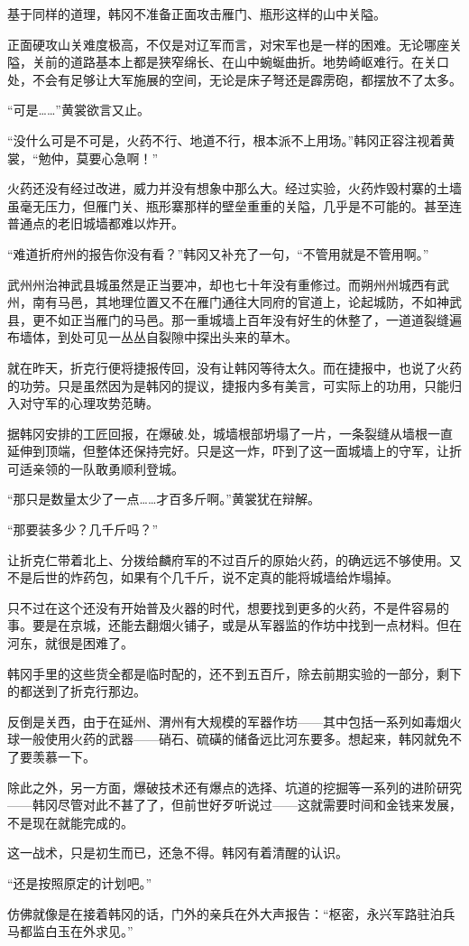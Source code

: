 基于同样的道理，韩冈不准备正面攻击雁门、瓶形这样的山中关隘。

正面硬攻山关难度极高，不仅是对辽军而言，对宋军也是一样的困难。无论哪座关隘，关前的道路基本上都是狭窄绵长、在山中蜿蜒曲折。地势崎岖难行。在关口处，不会有足够让大军施展的空间，无论是床子弩还是霹雳砲，都摆放不了太多。

“可是……”黄裳欲言又止。

“没什么可是不可是，火药不行、地道不行，根本派不上用场。”韩冈正容注视着黄裳，“勉仲，莫要心急啊！”

火药还没有经过改进，威力并没有想象中那么大。经过实验，火药炸毁村寨的土墙虽毫无压力，但雁门关、瓶形寨那样的壁垒重重的关隘，几乎是不可能的。甚至连普通点的老旧城墙都难以炸开。

“难道折府州的报告你没有看？”韩冈又补充了一句，“不管用就是不管用啊。”

武州州治神武县城虽然是正当要冲，却也七十年没有重修过。而朔州州城西有武州，南有马邑，其地理位置又不在雁门通往大同府的官道上，论起城防，不如神武县，更不如正当雁门的马邑。那一重城墙上百年没有好生的休整了，一道道裂缝遍布墙体，到处可见一丛丛自裂隙中探出头来的草木。

就在昨天，折克行便将捷报传回，没有让韩冈等待太久。而在捷报中，也说了火药的功劳。只是虽然因为是韩冈的提议，捷报内多有美言，可实际上的功用，只能归入对守军的心理攻势范畴。

据韩冈安排的工匠回报，在爆破.处，城墙根部坍塌了一片，一条裂缝从墙根一直延伸到顶端，但整体还保持完好。只是这一炸，吓到了这一面城墙上的守军，让折可适亲领的一队敢勇顺利登城。

“那只是数量太少了一点……才百多斤啊。”黄裳犹在辩解。

“那要装多少？几千斤吗？”

让折克仁带着北上、分拨给麟府军的不过百斤的原始火药，的确远远不够使用。又不是后世的炸药包，如果有个几千斤，说不定真的能将城墙给炸塌掉。

只不过在这个还没有开始普及火器的时代，想要找到更多的火药，不是件容易的事。要是在京城，还能去翻烟火铺子，或是从军器监的作坊中找到一点材料。但在河东，就很是困难了。

韩冈手里的这些货全都是临时配的，还不到五百斤，除去前期实验的一部分，剩下的都送到了折克行那边。

反倒是关西，由于在延州、渭州有大规模的军器作坊——其中包括一系列如毒烟火球一般使用火药的武器——硝石、硫磺的储备远比河东要多。想起来，韩冈就免不了要羡慕一下。

除此之外，另一方面，爆破技术还有爆点的选择、坑道的挖掘等一系列的进阶研究——韩冈尽管对此不甚了了，但前世好歹听说过——这就需要时间和金钱来发展，不是现在就能完成的。

这一战术，只是初生而已，还急不得。韩冈有着清醒的认识。

“还是按照原定的计划吧。”

仿佛就像是在接着韩冈的话，门外的亲兵在外大声报告：“枢密，永兴军路驻泊兵马都监白玉在外求见。”
